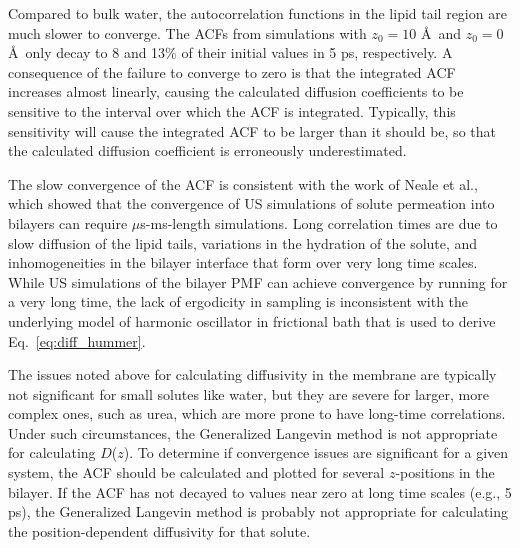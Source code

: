   \par Compared to bulk water, the autocorrelation functions in the lipid tail region are much slower to converge.  The ACFs from simulations with $z_0=10$ \AA\ and $z_0=0$ \AA\ only decay to 8 and 13\% of their initial values in 5 ps, respectively. A consequence of the 
failure to converge to zero is that the integrated ACF increases almost linearly, 
causing the calculated diffusion coefficients to be sensitive 
to the interval over which the ACF is integrated.  Typically, this sensitivity will cause 
the integrated ACF to be larger than it should be, so that the calculated diffusion coefficient is erroneously underestimated.

The slow convergence of the ACF is consistent with the work of Neale et al.,\cite{Neale2011} 
which showed that the convergence of US simulations of solute permeation 
into bilayers can require $\mu$s-ms-length simulations. Long correlation times are 
due to slow diffusion of the lipid tails, variations in the hydration of the solute, and
inhomogeneities in the bilayer interface that form over very long time scales.\cite{Neale2013}
While US simulations of the bilayer PMF can achieve convergence by running for a very long time, the 
lack of ergodicity in sampling is inconsistent with the underlying model of harmonic 
oscillator in frictional bath that is used to derive Eq.~\ref{eq:diff_hummer}.

The issues noted above for calculating diffusivity in the membrane are typically not 
significant for small solutes like water,\cite{Riahi2014,Issack2015} 
but they are severe for larger, more complex ones, such as urea, which are more prone to 
have long-time correlations. Under such circumstances, the Generalized Langevin method is not appropriate for 
calculating $D$($z$).  To determine if convergence issues are significant for a given 
system, the ACF should be calculated and plotted for several $z$-positions in the bilayer. If the ACF 
has not decayed to values near zero at long time scales (e.g., 5 ps), the Generalized Langevin 
method is probably not appropriate for calculating the position-dependent diffusivity for that solute. 

